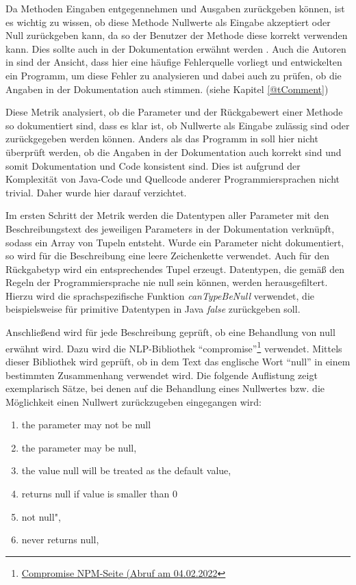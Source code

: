  Da Methoden Eingaben entgegennehmen und Ausgaben zurückgeben können, ist es wichtig zu wissen, ob diese Methode Nullwerte als Eingabe akzeptiert oder Null zurückgeben kann, da so der Benutzer der Methode diese korrekt verwenden kann. Dies sollte auch in der Dokumentation erwähnt werden \cite{javadoc_coding_standards}. Auch die Autoren in \cite[S. 260 ff.]{@tComment:TestingJavadocCommentstoDetectComment-CodeInconsistencies} sind der Ansicht, dass hier eine häufige Fehlerquelle vorliegt und entwickelten ein Programm, um diese Fehler zu analysieren und dabei auch zu prüfen, ob die Angaben in der Dokumentation auch stimmen. (siehe Kapitel \ref{@tComment})
 
 Diese Metrik analysiert, ob die Parameter und der Rückgabewert einer Methode so dokumentiert sind, dass es klar ist, ob Nullwerte als Eingabe zulässig sind oder zurückgegeben werden können. Anders als das Programm in \cite[S. 260 ff.]{@tComment:TestingJavadocCommentstoDetectComment-CodeInconsistencies} soll hier nicht überprüft werden, ob die Angaben in der Dokumentation auch korrekt sind und somit Dokumentation und Code konsistent sind. Dies ist aufgrund der Komplexität von Java-Code und Quellcode anderer Programmiersprachen nicht trivial. Daher wurde hier darauf verzichtet.
 
 Im ersten Schritt der Metrik werden die Datentypen aller Parameter mit den Beschreibungstext des jeweiligen Parameters in der Dokumentation verknüpft, sodass ein Array von Tupeln entsteht. Wurde ein Parameter nicht dokumentiert, so wird für die Beschreibung eine leere Zeichenkette verwendet. Auch für den Rückgabetyp wird ein entsprechendes Tupel erzeugt. Datentypen, die gemäß den Regeln der Programmiersprache nie null sein können, werden herausgefiltert. Hierzu wird die sprachspezifische Funktion \textit{canTypeBeNull} verwendet, die beispielsweise für primitive Datentypen in Java \textit{false} zurückgeben soll. 
 
 Anschließend wird für jede Beschreibung geprüft, ob eine Behandlung von null erwähnt wird. Dazu wird die \ac{NLP}-Bibliothek \enquote{compromise}\footnote{\href{https://www.npmjs.com/package/compromise?activeTab=readme}{Compromise NPM-Seite (Abruf am 04.02.2022}} verwendet. Mittels dieser Bibliothek wird geprüft, ob in dem Text das englische Wort \enquote{null} in einem bestimmten Zusammenhang verwendet wird. Die folgende Auflistung zeigt exemplarisch Sätze, bei denen auf die Behandlung eines Nullwertes bzw. die Möglichkeit einen Nullwert zurückzugeben eingegangen wird:
 \begin{enumerate}
      \item  the parameter may not be null
       \item  the parameter may be null,
       \item  the value null will be treated as the default value,
       
      \item  returns null if value is smaller than 0
       \item  not null",
       \item  never returns null,
 \end{enumerate}
 
